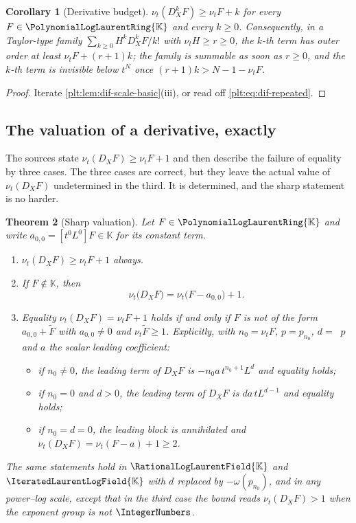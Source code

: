 \documentclass[11pt,oneside]{article}
\theoremstyle{plain}
\newtheorem{theorem}{Theorem}[section]
\newtheorem{corollary}[theorem]{Corollary}
\theoremstyle{definition}
\theoremstyle{remark}
\newcommand{\K}{\mathbb{K}}
\newcommand{\PLlau}{\PolynomialLogLaurentRing{\K}}       %
\newcommand{\PLrat}{\RationalLogLaurentField{\K}}        %
\newcommand{\PLit}{\IteratedLaurentLogField{\K}}         %
\newcommand{\ordt}{\nu_{t}}                              %
\DeclareMathOperator{\degL}{deg_{L}}
\newcommand{\DX}{D_{X}}                                  %
\begin{document}
\begin{corollary}[Derivative budget]\label{plt:cor:dif-budget}
\(\ordt(\DX^{k}F)\ge\ordt F+k\) for every \(F\in\PLlau\) and every \(k\ge0\).
Consequently, in a Taylor-type family \(\sum_{k\ge0}H^{k}\DX^{k}F/k!\) with
\(\ordt H\ge r\ge0\), the \(k\)-th term has outer order at least
\(\ordt F+(r+1)k\); the family is summable as soon as \(r\ge0\), and the
\(k\)-th term is invisible below \(t^{N}\) once \((r+1)k>N-1-\ordt F\).
\end{corollary}

\begin{proof}
Iterate \cref{plt:lem:dif-scale-basic}(iii), or read off
\cref{plt:eq:dif-repeated}.
\end{proof}

\subsection{The valuation of a derivative, exactly}
\label{plt:sec:dif-valuation}

The sources state \(\ordt(\DX F)\ge\ordt F+1\) and then describe the failure of
equality by three cases.  The three cases are correct, but they leave the
actual value of \(\ordt(\DX F)\) undetermined in the third.  It is determined,
and the sharp statement is no harder.

\begin{theorem}[Sharp valuation]\label{plt:thm:dif-valuation}
Let \(F\in\PLlau\) and write \(a_{0,0}=[t^{0}L^{0}]F\in\K\) for its constant
term.
\begin{enumerate}
\item \(\ordt(\DX F)\ge\ordt F+1\) always.
\item If \(F\notin\K\), then
\begin{equation}\label{plt:eq:dif-sharp-valuation}
  \ordt\bigl(\DX F\bigr)=\ordt\bigl(F-a_{0,0}\bigr)+1 .
\end{equation}
\item Equality \(\ordt(\DX F)=\ordt F+1\) holds if and only if \(F\) is not of
      the form \(a_{0,0}+\widetilde F\) with \(a_{0,0}\ne0\) and
      \(\ordt\widetilde F\ge1\).  Explicitly, with \(n_{0}=\ordt F\),
      \(p=p_{n_{0}}\), \(d=\degL p\) and \(a\) the scalar leading coefficient:
      \begin{itemize}
      \item if \(n_{0}\ne0\), the leading term of \(\DX F\) is
        \(-n_{0}a\,t^{n_{0}+1}L^{d}\) and equality holds;
      \item if \(n_{0}=0\) and \(d>0\), the leading term of \(\DX F\) is
        \(da\,tL^{d-1}\) and equality holds;
      \item if \(n_{0}=d=0\), the leading block is annihilated and
        \(\ordt(\DX F)=\ordt(F-a)+1\ge2\).
      \end{itemize}
\end{enumerate}
The same statements hold in \(\PLrat\) and \(\PLit\) with \(d\) replaced by
\(-\omega(p_{n_{0}})\), and in any power--log scale, except that in the third
case the bound reads \(\ordt(\DX F)>1\) when the exponent group is not
\(\IntegerNumbers\).
\end{theorem}
\end{document}
